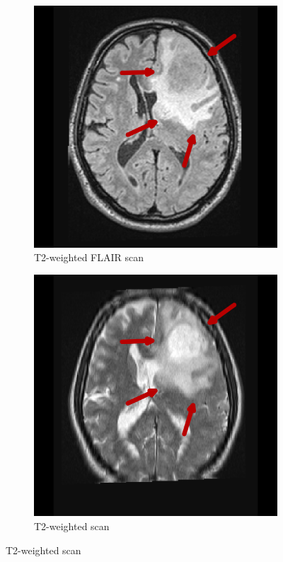 \begin{figure}[hbt]
    \begin{subfigure}[b]{0.45\textwidth}
        \centering
        \includegraphics[width=\textwidth]{Figures/FLAIR_arrows.png}
        \caption{T2-weighted FLAIR scan}\label{fig:intro_FLAIR}
    \end{subfigure}
    \begin{subfigure}[b]{0.45\textwidth}
        \centering
        \includegraphics[width=\textwidth]{Figures/T2_arrows.png}
        \caption{T2-weighted scan}\label{fig:intro_T2}
    \end{subfigure}


\end{figure}
